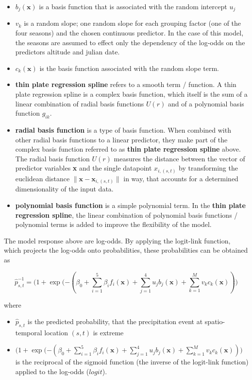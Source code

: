 \documentclass[
  12pt,
]{article}
\begin{document}
\begin{itemize}[label={\textbullet}]
    \item $b_j(\boldsymbol{x})$ is a basis function that is associated with the random intercept $u_j$
    \item $v_k$ is a random slope; one random slope for each grouping factor (one of the four seasons) and the chosen continuous predictor. In the case of this model, the seasons are assumed to effect only the dependency of the log-odds on the predictors altitude and julian date. 
    \item $c_k(\boldsymbol{x})$ is the basis function associated with the random slope term. 
    \item \textbf{thin plate regression spline} refers to a smooth term / function. A thin plate regression spline is a complex basis function, which itself is the sum of a linear combination of radial basis functions $U(r)$ and of a polynomial basis function $g_{ik}$.
    \item \textbf{radial basis function} is a type of basis function. When combined with other radial basis functions to a linear predictor, they make part of the complex basis function referred to as \textbf{thin plate regression spline} above. The radial basis function $U(r)$ measures the distance between the vector of predictor variables \textbf{x} and the single datapoint $x_{i,(s,t)}$ by transforming the euclidean distance $\lVert \boldsymbol{x} - \boldsymbol{x}_{i,(s,t)} \rVert$ in way, that accounts for a determined dimensionality of the input data. 
    \item \textbf{polynomial basis function} is a simple polynomial term. In the \textbf{thin plate regression spline}, the linear combination of polynomial basis functions / polynomial terms is added to improve the flexibility of the model. 
\end{itemize}

The model response above are log-odds. By applying the logit-link
function, which projects the log-odds onto probabilities, these
probabilities can be obtained as

\begin{equation}\label{eq:predicted_probability_gamm}
\widehat{p}^{-1}_{s,t} = \Biggl(1 + \exp(-(\beta_0+\sum_{i = 1}^{5} \beta_i f_i(\boldsymbol{x}) + \sum_{j = 1}^{4} u_j b_j(\boldsymbol{x}) + \sum_{k = 1}^{M} v_k c_k(\boldsymbol{x}))\Biggr)
\end{equation}

where

\begin{itemize}[label={}]
\item $\widehat{p}_{s,t}$ is the predicted probability, that the precipitation event at spatio-temporal location $(s,t)$ is extreme \newline
\item $\Biggl(1 + \exp(-(\beta_0+\sum_{i = 1}^{5} \beta_i f_i(\boldsymbol{x}) + \sum_{j = 1}^{4} u_j b_j(\boldsymbol{x}) + \sum_{k = 1}^{M} v_k c_k(\boldsymbol{x}))\Biggr)$ is the reciprocal of the sigmoid function (the inverse of the logit-link function) applied to the log-odds ($logit$).  
\end{itemize}
\end{document}
